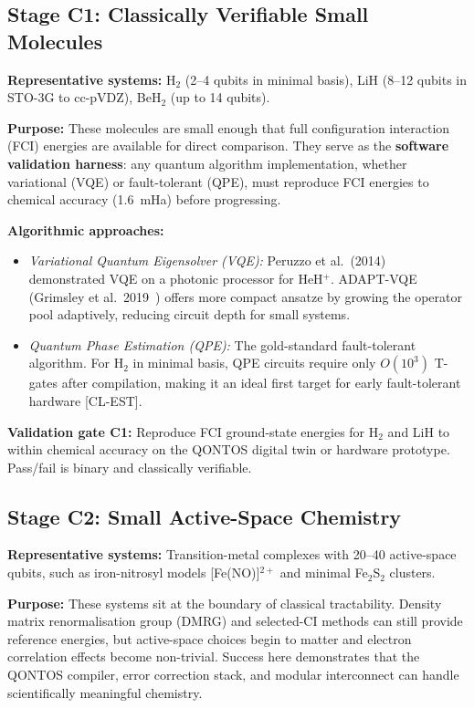 \documentclass[conference]{IEEEtran}
\begin{document}
\subsection{Stage C1: Classically Verifiable Small Molecules}

\textbf{Representative systems:} H$_2$ (2--4 qubits in minimal basis), LiH (8--12 qubits in
STO-3G to cc-pVDZ), BeH$_2$ (up to 14 qubits).

\textbf{Purpose:} These molecules are small enough that full configuration interaction (FCI)
energies are available for direct comparison. They serve as the \textbf{software validation
harness}: any quantum algorithm implementation, whether variational (VQE) or
fault-tolerant (QPE), must reproduce FCI energies to chemical accuracy (1.6~mHa)
before progressing.

\textbf{Algorithmic approaches:}

\begin{itemize}[leftmargin=*]
\item \textit{Variational Quantum Eigensolver (VQE):} Peruzzo et al.\ (2014)~\cite{peruzzo2014} demonstrated VQE on
  a photonic processor for HeH$^+$. ADAPT-VQE (Grimsley et al.\ 2019~\cite{grimsley2019}) offers more
  compact ansatze by growing the operator pool adaptively, reducing circuit depth for
  small systems.

\item \textit{Quantum Phase Estimation (QPE):} The gold-standard fault-tolerant algorithm.
  For H$_2$ in minimal basis, QPE circuits require only $O(10^3)$ T-gates after
  compilation, making it an ideal first target for early fault-tolerant hardware
  [CL-EST].
\end{itemize}

\textbf{Validation gate C1:} Reproduce FCI ground-state energies for H$_2$ and LiH to within
chemical accuracy on the QONTOS digital twin or hardware prototype. Pass/fail is
binary and classically verifiable.

\subsection{Stage C2: Small Active-Space Chemistry}

\textbf{Representative systems:} Transition-metal complexes with 20--40 active-space
qubits, such as iron-nitrosyl models [Fe(NO)]$^{2+}$ and minimal Fe$_2$S$_2$ clusters.

\textbf{Purpose:} These systems sit at the boundary of classical tractability. Density matrix
renormalisation group (DMRG) and selected-CI methods can still provide reference
energies, but active-space choices begin to matter and electron correlation effects
become non-trivial. Success here demonstrates that the QONTOS compiler, error
correction stack, and modular interconnect can handle scientifically meaningful
chemistry.
\end{document}

